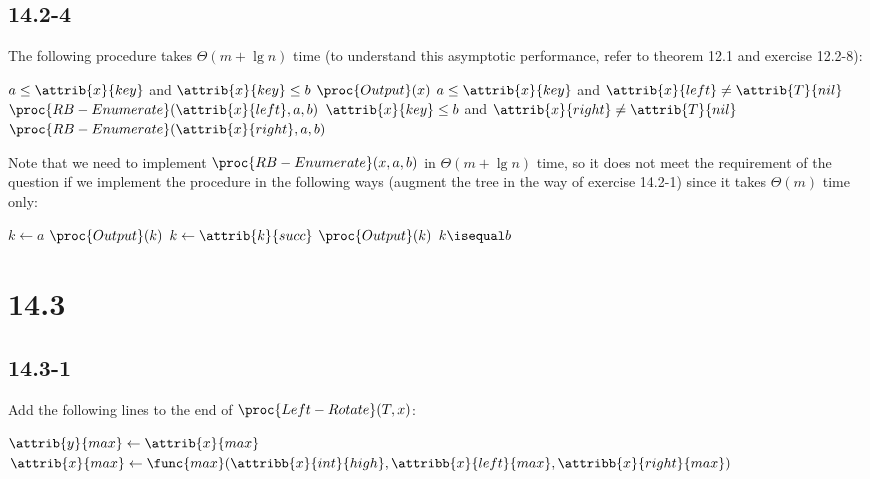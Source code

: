\subsection*{14.2-4}

\noindent
The following procedure takes $\Theta(m + \lg n)$ time 
(to understand this asymptotic performance, refer to theorem 12.1 and exercise 12.2-8):

\begin{codebox}
    \li \If $a \leq \attrib{x}{key}$ and $\attrib{x}{key} \leq b$
    \li \Then
            $\proc{Output}(x)$
        \End
    \li \If $a \leq \attrib{x}{key}$ and $\attrib{x}{left} \neq \attrib{T}{nil}$
    \li \Then
            $\proc{RB-Enumerate}(\attrib{x}{left}, a, b)$
        \End
    \li \If $\attrib{x}{key} \leq b$ and $\attrib{x}{right} \neq \attrib{T}{nil}$
    \li \Then
            $\proc{RB-Enumerate}(\attrib{x}{right}, a, b)$
        \End
\end{codebox}

\noindent
Note that we need to implement $\proc{RB-Enumerate}(x, a, b)$ in $\Theta(m + \lg n)$ time,
so it does not meet the requirement of the question
if we implement the procedure in the following ways (augment the tree in the way of exercise 14.2-1) 
since it takes $\Theta(m)$ time only:

\begin{codebox}
    \li $k \gets a$
    \li $\proc{Output}(k)$
    \li \Repeat
    \li     $k \gets \attrib{k}{succ}$
    \li     $\proc{Output}(k)$
    \li \Until $k \isequal b$
\end{codebox}

\section*{14.3}

\subsection*{14.3-1}

Add the following lines to the end of $\proc{Left-Rotate}(T, x)$:

\begin{codebox}
    \li $\attrib{y}{max} \gets \attrib{x}{max}$
    \li $\attrib{x}{max} \gets \func{max}(\attribb{x}{int}{high}, 
        \attribb{x}{left}{max}, \attribb{x}{right}{max})$
\end{codebox}

